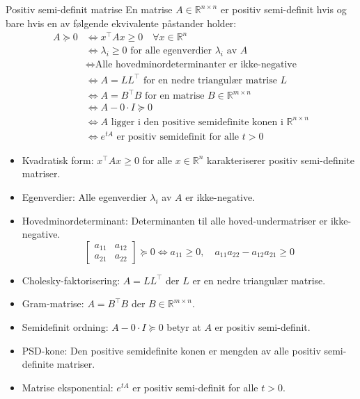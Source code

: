 \begin{remark}{Positiv semi-definit matrise}
  En matrise $A \in \mathbb{R}^{n \times n}$ er positiv semi-definit hvis og bare hvis en av følgende ekvivalente påstander holder:
  \begin{align*}
    A \succeq 0 & \iff x^\top A x \geq 0 \quad \forall x \in \mathbb{R}^n \tag{Kvadratisk form}                     \\
                & \iff \lambda_i \geq 0 \text{ for alle egenverdier } \lambda_i \text{ av } A \tag{Egenverdier}     \\
                & \iff \text{Alle hovedminordeterminanter er ikke-negative} \tag{Minordeterminanter}                \\
                & \iff A = LL^\top \text{ for en nedre triangulær matrise } L \tag{Cholesky}                        \\
                & \iff A = B^\top B \text{ for en matrise } B \in \mathbb{R}^{m \times n} \tag{Gram}                \\
                & \iff A - 0 \cdot I \succeq 0 \tag{Semidefinit ordning}                                            \\
                & \iff A \text{ ligger i den positive semidefinite konen i } \mathbb{R}^{n \times n} \tag{PSD kone} \\
                & \iff e^{tA} \text{ er positiv semidefinit for alle } t > 0 \tag{Matrise eksponential}
  \end{align*}

  \begin{itemize}
    \item Kvadratisk form: $x^\top A x \geq 0$ for alle $x \in \mathbb{R}^n$ karakteriserer positiv semi-definite matriser.
    \item Egenverdier: Alle egenverdier $\lambda_i$ av $A$ er ikke-negative.
    \item Hovedminordeterminant: Determinanten til alle hoved-undermatriser er ikke-negative.
          \[
            \begin{bmatrix}
              a_{11} & a_{12} \\
              a_{21} & a_{22}
            \end{bmatrix} \succeq 0 \iff a_{11} \geq 0, \quad a_{11}a_{22} - a_{12}a_{21} \geq 0
          \]

    \item Cholesky-faktorisering: $A = LL^\top$ der $L$ er en nedre triangulær matrise.
    \item Gram-matrise: $A = B^\top B$ der $B \in \mathbb{R}^{m \times n}$.
    \item Semidefinit ordning: $A - 0 \cdot I \succeq 0$ betyr at $A$ er positiv semi-definit.
    \item PSD-kone: Den positive semidefinite konen er mengden av alle positiv semi-definite matriser.
    \item Matrise eksponential: $e^{tA}$ er positiv semi-definit for alle $t > 0$.
  \end{itemize}
\end{remark}


